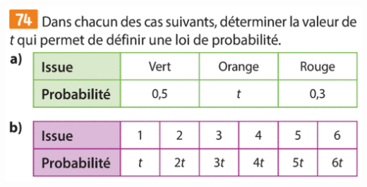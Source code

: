 \documentclass{article}
\begin{document}
\begin{center}
\includegraphics[width=\textwidth]{Exercice_6.png}
\end{center}
\end{document}

